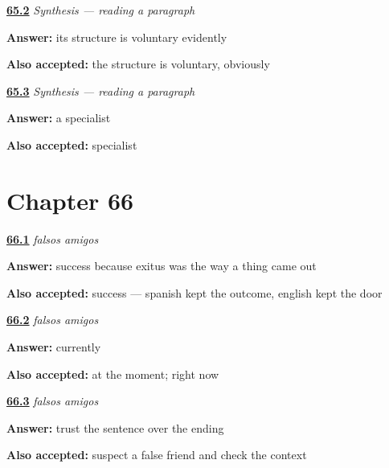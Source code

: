 \noindent\begin{minipage}[t]{\linewidth}
\raggedright
\hyperlink{review-ES-C09-sintesis-ocho-mix}{\textbf{65.2}} \emph{Synthesis — reading a paragraph}\par
\small \textbf{Answer:} its structure is voluntary evidently\par
\footnotesize \textbf{Also accepted:} the structure is voluntary, obviously
\end{minipage}\par\medskip

\noindent\begin{minipage}[t]{\linewidth}
\raggedright
\hyperlink{review-ES-C09-sintesis-ocho-new}{\textbf{65.3}} \emph{Synthesis — reading a paragraph}\par
\small \textbf{Answer:} a specialist\par
\footnotesize \textbf{Also accepted:} specialist
\end{minipage}\par\medskip

\section*{Chapter 66}

\noindent\begin{minipage}[t]{\linewidth}
\raggedright
\hyperlink{review-ES-C09-falsos-amigos-exito}{\textbf{66.1}} \emph{falsos amigos}\par
\small \textbf{Answer:} success because exitus was the way a thing came out\par
\footnotesize \textbf{Also accepted:} success — spanish kept the outcome, english kept the door
\end{minipage}\par\medskip

\noindent\begin{minipage}[t]{\linewidth}
\raggedright
\hyperlink{review-ES-C09-falsos-amigos-actual}{\textbf{66.2}} \emph{falsos amigos}\par
\small \textbf{Answer:} currently\par
\footnotesize \textbf{Also accepted:} at the moment; right now
\end{minipage}\par\medskip

\noindent\begin{minipage}[t]{\linewidth}
\raggedright
\hyperlink{review-ES-C09-falsos-amigos-method}{\textbf{66.3}} \emph{falsos amigos}\par
\small \textbf{Answer:} trust the sentence over the ending\par
\footnotesize \textbf{Also accepted:} suspect a false friend and check the context
\end{minipage}\par\medskip

